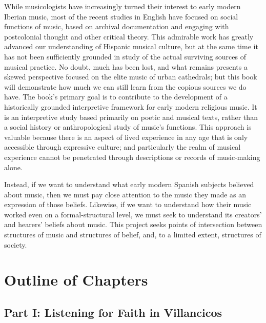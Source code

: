 \documentclass[tt]{vcbook-proposal}
\begin{document}
While musicologists have increasingly turned their interest to early modern Iberian music, most of the recent studies in English have focused on social functions of music, based on archival documentation and engaging with postcolonial thought and other critical theory.
This admirable work has greatly advanced our understanding of Hispanic musical culture, but at the same time it has not been sufficiently grounded in study of the actual surviving sources of musical practice.
No doubt, much has been lost, and what remains presents a skewed perspective focused on the elite music of urban cathedrals; but this book will demonstrate how much we can still learn from the copious sources we do have.
The book's primary goal is to contribute to the development of a historically grounded interpretive framework for early modern religious music.
It is an interpretive study based primarily on poetic and musical texts, rather than a social history or anthropological study of music's functions.
This approach is valuable because there is an aspect of lived experience in any age that is only accessible through expressive culture; and particularly the realm of musical experience cannot be penetrated through descriptions or records of music-making alone. 

Instead, if we want to understand what early modern Spanish subjects believed about music, then we must pay close attention to the music they made as an expression of those beliefs.
Likewise, if we want to understand how their music worked even on a formal-structural level, we must seek to understand its creators' and hearers' beliefs about music.
This project seeks points of intersection between structures of music and structures of belief, and, to a  limited extent, structures of society.


\section{Outline of Chapters}

\subsection{Part I: Listening for Faith in Villancicos}
\end{document}
